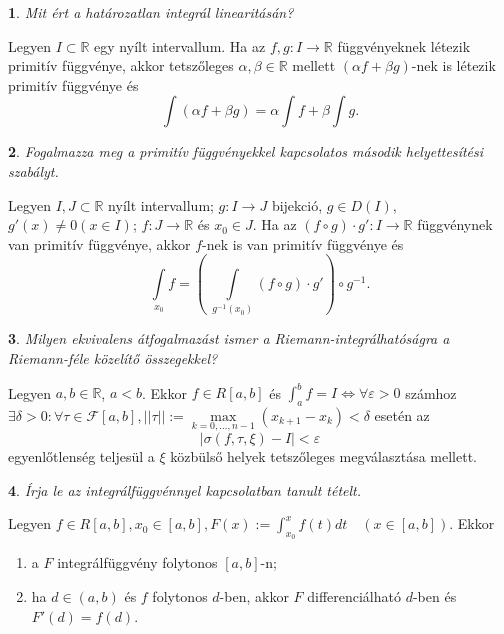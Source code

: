 \documentclass[a4paper]{article}
\def\R{\mathbb{R}}
\theoremstyle{qstyle}
\newtheorem{question}{}{}
\begin{document}
	\begin{question}
		Mit ért a határozatlan integrál linearitásán?
	\end{question}
	Legyen $I\subset\R$ egy nyílt intervallum. Ha az $f,g : I\to\R$ függvényeknek létezik primitív függvénye, akkor tetszőleges $\alpha,\beta\in\R$ mellett $(\alpha f+\beta g)$-nek is létezik primitív függvénye és
	$$\int (\alpha f+\beta g) = \alpha \int f + \beta \int g \text{.}$$
	
	\begin{question}
		Fogalmazza meg a primitív függvényekkel kapcsolatos \emph{második helyettesítési szabályt}.
	\end{question}
	Legyen $I,J \subset \R$ nyílt intervallum; $g : I \to J$ bijekció, $g \in D(I)$, $g'(x) \neq 0 (x \in I)$; $f : J \to \R$ és $x_0 \in J$. Ha az $(f \circ g) \cdot g' : I \to \R$ függvénynek van primitív függvénye, akkor $f$-nek is van primitív függvénye és
	$$\int\limits_{x_0} f = \left(\; \int\limits_{g^{-1}(x_0)} (f \circ g) \cdot g' \right) \circ g^{-1} \text{.} $$
	
	\begin{question}
		Milyen ekvivalens átfogalmazást ismer a Riemann-integrálhatóságra a
		Riemann-féle közelítő összegekkel?

	\end{question}
	Legyen $a,b \in \R$, $a<b$. Ekkor $f\in R[a,b]$ és $\int_{a}^{b} f = I \Longleftrightarrow \forall \varepsilon > 0$ számhoz $\exists \delta > 0: \forall \tau \in \mathcal{F}[a,b], ||\tau || := \max\limits_{k = 0,\dots,n-1} (x_{k+1} - x_k) < \delta$ esetén az
	$$|\sigma (f,\tau,\xi)-I| < \varepsilon$$
	egyenlőtlenség teljesül a $\xi$ közbülső helyek tetszőleges megválasztása mellett.

	\begin{question}
		Írja le az integrálfüggvénnyel kapcsolatban tanult tételt.
	\end{question}
	Legyen $f\in R[a,b],x_0\in [a,b], F(x) := \int_{x_0}^{x} f(t) dt \quad (x \in [a,b])$. Ekkor
	\vspace{-4mm}
	\begin{enumerate}
		\item a $F$ integrálfüggvény folytonos $[a,b]$-n;
		\item ha $d\in (a,b)$ és $f$ folytonos $d$-ben, akkor $F$ differenciálható $d$-ben és $F'(d)=f(d)$.
	\end{enumerate}
	\vspace{-4mm}
	
\end{document}
